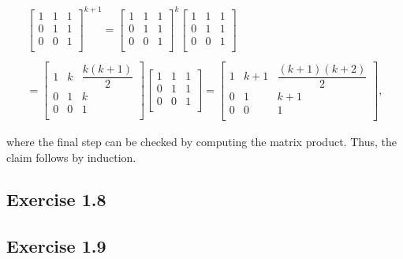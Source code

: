 \documentclass{article}
\begin{document}
\begin{gather*}
    \begin{bmatrix}
    1 & 1 & 1\\
    0 & 1 & 1\\
    0 & 0 & 1\\
    \end{bmatrix}^{k+1}
    =
    \begin{bmatrix}
    1 & 1 & 1\\
    0 & 1 & 1\\
    0 & 0 & 1\\
    \end{bmatrix}^k
    \begin{bmatrix}
    1 & 1 & 1\\
    0 & 1 & 1\\
    0 & 0 & 1\\
    \end{bmatrix}\\ \\
    =
    \begin{bmatrix}
    1 & k & \dfrac{k(k+1)}{2}\\
    0 & 1 & k\\
    0 & 0 & 1\\
    \end{bmatrix}
    \begin{bmatrix}
    1 & 1 & 1\\
    0 & 1 & 1\\
    0 & 0 & 1\\
    \end{bmatrix}
    =
    \begin{bmatrix}
    1 & k+1 & \dfrac{(k+1)(k+2)}{2}\\
    0 & 1 & k+1\\
    0 & 0 & 1\\
    \end{bmatrix},
\end{gather*}

where the final step can be checked by computing the matrix product. Thus, the claim follows by induction.

\subsection*{Exercise 1.8}



\subsection*{Exercise 1.9}
\end{document}
